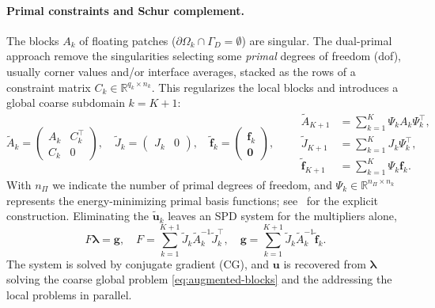 \documentclass{article}
\newcommand{\vect}[1]{\boldsymbol{#1}}
\newcommand{\R}{\mathbb{R}}
\newcommand{\npatch}{K} %
\newcommand{\patchdom}[1]{\Omega_{#1}}            %
\newcommand{\uglo}{\vect{u}}                      %
\newcommand{\Aloc}[1]{A_{#1}}                    %
\newcommand{\Aaug}[1]{\widetilde{A}_{#1}}        %
\newcommand{\floc}[1]{\vect{f}_{#1}}             %
\newcommand{\faug}[1]{\widetilde{\vect{f}}_{#1}} %
\newcommand{\Jloc}[1]{J_{#1}}                    %
\newcommand{\Jaug}[1]{\widetilde{J}_{#1}}        %
\newcommand{\Cloc}[1]{C_{#1}}                    %
\newcommand{\Psik}[1]{\Psi_{#1}}                 %
\newcommand{\nprim}{n_\Pi}                        %
\newcommand{\Fschur}{F}                           %
\newcommand{\gschur}{\vect{g}}                    %
\newcommand{\uaug}[1]{\widetilde{\vect{u}}_{#1}} %
\newcommand{\lagmult}{\vect{\lambda}}             %
\theoremstyle{plain}
\numberwithin{equation}{section}
\begin{document}
\paragraph{Primal constraints and Schur complement.}
The blocks $\Aloc{k}$ of floating patches ($\partial\patchdom{k} \cap \Gamma_D =
    \emptyset$) are singular. The dual-primal approach remove the singularities selecting some \emph{primal}
degrees of freedom (dof), usually corner values and/or interface averages, stacked as the
rows of a constraint matrix $\Cloc{k} \in \R^{q_k \times n_k}$.
This regularizes the local blocks and introduces a global
coarse subdomain $k = \npatch + 1$:
\begin{equation}
    \Aaug{k} =
    \begin{pmatrix} \Aloc{k} & \Cloc{k}^{\top} \\ \Cloc{k} & 0 \end{pmatrix},
    \quad
    \Jaug{k} = \begin{pmatrix} \Jloc{k} & 0 \end{pmatrix},
    \quad
    \faug{k} = \begin{pmatrix} \floc{k} \\ \vect{0} \end{pmatrix},
    \qquad
    \begin{aligned}
        \Aaug{\npatch+1} & = \textstyle\sum_{k=1}^{\npatch} \Psik{k} \Aloc{k} \Psik{k}^{\top}, \\
        \Jaug{\npatch+1} & = \textstyle\sum_{k=1}^{\npatch} \Jloc{k} \Psik{k}^{\top},          \\
        \faug{\npatch+1} & = \textstyle\sum_{k=1}^{\npatch} \Psik{k} \floc{k}.
    \end{aligned}
    \label{eq:augmented-blocks}
\end{equation}
With $\nprim$ we indicate the number of primal degrees of freedom, and $\Psik{k} \in
    \R^{\nprim \times n_k}$ represents the energy-minimizing primal basis functions;
see~\cite{kleiss2012ieti} for the explicit construction. Eliminating the
$\uaug{k}$ leaves an SPD system for the multipliers alone,
\begin{equation}
    \Fschur \lagmult = \gschur,
    \quad
    \Fschur = \sum_{k=1}^{\npatch+1} \Jaug{k} \Aaug{k}^{-1}
    \Jaug{k}^{\top},
    \quad
    \gschur = \sum_{k=1}^{\npatch+1} \Jaug{k} \Aaug{k}^{-1}
    \faug{k}.
    \label{eq:ieti-schur}
\end{equation}
The system is solved by conjugate gradient (CG), and $\uglo$ is
recovered from $\lagmult$ solving the coarse global problem \eqref{eq:augmented-blocks}
and the addressing the local problems in parallel.
\end{document}

